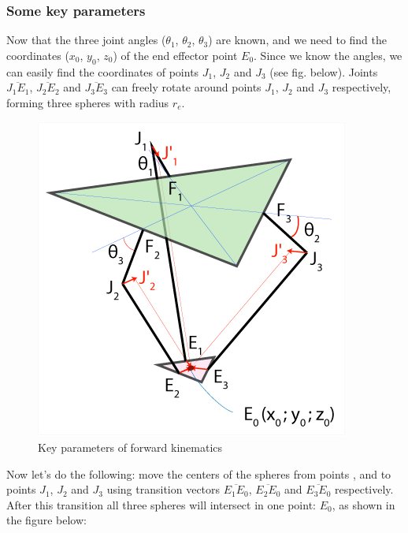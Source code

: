 \subsubsection{Some key parameters}
Now that the three joint angles ($\theta_{1}$, $\theta_{2}$, $\theta_{3}$) are known, and we need to find the coordinates ($x_{0}$, $y_{0}$, $z_{0}$) of the end effector point $E_{0}$.
Since we know the angles, we can easily find the coordinates of points $J_{1}$, $J_{2}$ and $J_{3}$ (see fig. below).
Joints $\overline{J_{1}E_{1}}$, $\overline{J_{2}E_{2}}$ and $\overline{J_{3}E_{3}}$ can freely rotate around points $J_{1}$, $J_{2}$ and $J_{3}$ respectively, forming three spheres with radius $r_{e}$.
\begin{figure}[H]
	\centering
	\includegraphics[width=\maxwidth{15cm}, keepaspectratio]{Chapters/Fig/forward_kinematics_key_parameters.png}
	\caption{Key parameters of forward kinematics}
	\label{fig:forward_kinematics_key_parameters}
\end{figure}
Now let's do the following: move the centers of the spheres from points , and to points $J_{1}$, $J_{2}$ and $J_{3}$ using transition vectors $\overline{E_{1}E_{0}}$, $\overline{E_{2}E_{0}}$ and $\overline{E_{3}E_{0}}$ respectively. After this transition all three spheres will
intersect in one point: $E_{0}$, as shown in the figure below:
